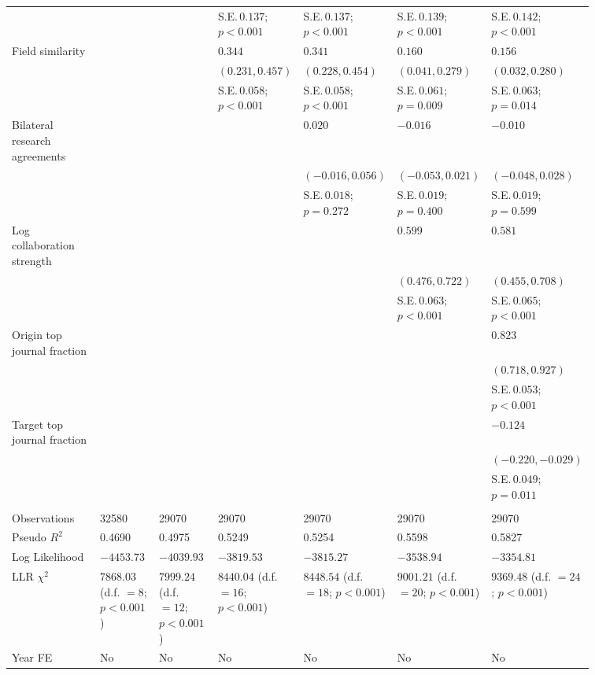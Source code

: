 \begin{table}[H]
{\begin{tabular}{p{0.2\linewidth}p{0.11\linewidth}p{0.11\linewidth}p{0.11\linewidth}p{0.11\linewidth}p{0.11\linewidth}p{0.11\linewidth}}
 &  &  & S.E.\,$0.137$; ${p < 0.001}$ & S.E.\,$0.137$; ${p < 0.001}$ & S.E.\,$0.139$; ${p < 0.001}$ & S.E.\,$0.142$; ${p < 0.001}$\\ [0.8ex]  
Field similarity &  &  & $0.344$ & $0.341$ & $0.160$ & $0.156$\\ 
 &  &  & $(0.231, 0.457)$ & $(0.228, 0.454)$ & $(0.041, 0.279)$ & $(0.032, 0.280)$\\ 
 &  &  & S.E.\,$0.058$; ${p < 0.001}$ & S.E.\,$0.058$; ${p < 0.001}$ & S.E.\,$0.061$; ${p = 0.009}$ & S.E.\,$0.063$; ${p = 0.014}$\\ [0.8ex]  
Bilateral research agreements &  &  &  & $0.020$ & $-0.016$ & $-0.010$\\ 
 &  &  &  & $(-0.016, 0.056)$ & $(-0.053, 0.021)$ & $(-0.048, 0.028)$\\ 
 &  &  &  & S.E.\,$0.018$; ${p = 0.272}$ & S.E.\,$0.019$; ${p = 0.400}$ & S.E.\,$0.019$; ${p = 0.599}$\\ [0.8ex]  
Log collaboration strength &  &  &  &  & $0.599$ & $0.581$\\ 
 &  &  &  &  & $(0.476, 0.722)$ & $(0.455, 0.708)$\\ 
 &  &  &  &  & S.E.\,$0.063$; ${p < 0.001}$ & S.E.\,$0.065$; ${p < 0.001}$\\ [0.8ex]  
Origin top journal fraction &  &  &  &  &  & $0.823$\\ 
 &  &  &  &  &  & $(0.718, 0.927)$\\ 
 &  &  &  &  &  & S.E.\,$0.053$; ${p < 0.001}$\\ [0.8ex]  
Target top journal fraction &  &  &  &  &  & $-0.124$\\ 
 &  &  &  &  &  & $(-0.220, -0.029)$\\ 
 &  &  &  &  &  & S.E.\,$0.049$; ${p = 0.011}$\\ [0.8ex]  
\hline 
\hline \\[-1.8ex] 
Observations & 32580 & 29070 & 29070 & 29070 & 29070 & 29070 \\ 
Pseudo $R^2$ & 0.4690 & 0.4975 & 0.5249 & 0.5254 & 0.5598 & 0.5827 \\ 
Log Likelihood & $-4453.73$ & $-4039.93$ & $-3819.53$ & $-3815.27$ & $-3538.94$ & $-3354.81$ \\ 
LLR $\chi^2$  & $7868.03$ (d.f. $= 8$; ${p < 0.001}$) & $7999.24$ (d.f. $= 12$; ${p < 0.001}$) & $8440.04$ (d.f. $= 16$; ${p < 0.001}$) & $8448.54$ (d.f. $= 18$; ${p < 0.001}$) & $9001.21$ (d.f. $= 20$; ${p < 0.001}$) & $9369.48$ (d.f. $= 24$; ${p < 0.001}$) \\ 
Year FE  & No & No & No & No & No & No \\ 
\hline 
\end{tabular}
}
\end{table}

